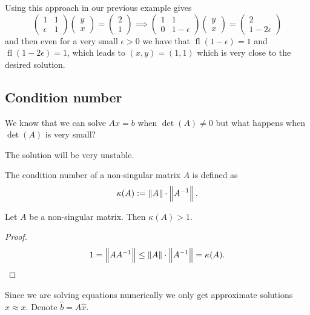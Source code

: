 \documentclass[11pt,a4paper]{article}
\DeclareMathOperator{\fl}{fl}
\begin{document}
Using this approach in our previous example gives
\[
  \begin{pmatrix}
    1 & 1 \\
    \epsilon & 1
  \end{pmatrix}
  \begin{pmatrix}
    y \\ x
  \end{pmatrix} =
  \begin{pmatrix}
    2 \\ 1
  \end{pmatrix} \implies
  \begin{pmatrix}
    1 & 1 \\
    0 & 1 - \epsilon
  \end{pmatrix}
  \begin{pmatrix}
    y \\ x
  \end{pmatrix} =
  \begin{pmatrix}
    2 \\ 1 - 2 \epsilon
  \end{pmatrix}
\]
and then even for a very small $\epsilon > 0$ we have that
$\fl(1 - \epsilon) = 1$ and $\fl(1 - 2 \epsilon) = 1$,
which leads to $(x,y) = (1,1)$ which is very close to the desired solution.

\subsection{Condition number}
\begin{question}
  We know that we can solve $Ax = b$ when $\det(A) \neq 0$ but what happens
  when $\det(A)$ is very small?
\end{question}
\begin{answer}
  The solution will be very unstable.
\end{answer}

\begin{definition}
  The condition number of a non-singular matrix $A$ is defined as
  \[
    \kappa(A) := \left\lVert A\right\rVert \cdot \left\lVert A^{-1}\right\rVert.
  \]
\end{definition}
\begin{lemma}
  Let $A$ be a non-singular matrix.
  Then $\kappa(A) > 1$.
\end{lemma}
\begin{proof}
  \[
    1 = \left\lVert A A^{-1}\right\rVert \le \left\lVert A\right\rVert \cdot \left\lVert A^{-1}\right\rVert = \kappa(A).
  \]
\end{proof}

\begin{remark}
  Since we are solving equations numerically we only get approximate
  solutions $\hat x \approx x$.
  Denote $\hat b = A \hat x$.
\end{remark}
\end{document}
